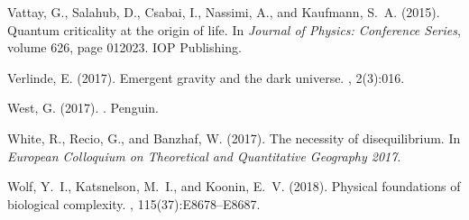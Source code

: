 \begin{thebibliography}{}
Vattay, G., Salahub, D., Csabai, I., Nassimi, A., and Kaufmann, S.~A. (2015).
\newblock Quantum criticality at the origin of life.
\newblock In {\em Journal of Physics: Conference Series}, volume 626, page
  012023. IOP Publishing.

Verlinde, E. (2017).
\newblock Emergent gravity and the dark universe.
, 2(3):016.

West, G. (2017).
.
\newblock Penguin.

White, R., Recio, G., and Banzhaf, W. (2017).
\newblock The necessity of disequilibrium.
\newblock In {\em European Colloquium on Theoretical and Quantitative Geography
  2017}.

Wolf, Y.~I., Katsnelson, M.~I., and Koonin, E.~V. (2018).
\newblock Physical foundations of biological complexity.
,
  115(37):E8678--E8687.

\end{thebibliography}





